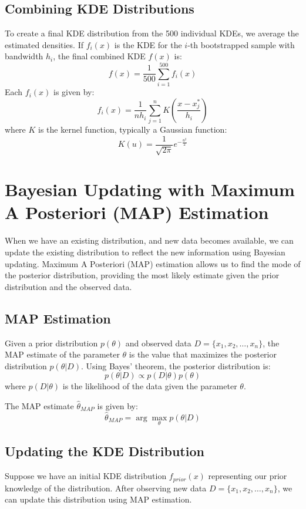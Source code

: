 \documentclass[conference]{IEEEtran}
\begin{document}
\subsection{Combining KDE Distributions}
To create a final KDE distribution from the 500 individual KDEs, we average the estimated densities. If \( f_i(x) \) is the KDE for the \( i \)-th bootstrapped sample with bandwidth \( h_i \), the final combined KDE \( f(x) \) is:
\[
f(x) = \frac{1}{500} \sum_{i=1}^{500} f_i(x)
\]
Each \( f_i(x) \) is given by:
\[
f_i(x) = \frac{1}{n h_i} \sum_{j=1}^{n} K \left( \frac{x - x_j^*}{h_i} \right)
\]
where \( K \) is the kernel function, typically a Gaussian function:
\[
K(u) = \frac{1}{\sqrt{2\pi}} e^{-\frac{u^2}{2}}
\]

\section{Bayesian Updating with Maximum A Posteriori (MAP) Estimation}
When we have an existing distribution, and new data becomes available, we can update the existing distribution to reflect the new information using Bayesian updating. Maximum A Posteriori (MAP) estimation allows us to find the mode of the posterior distribution, providing the most likely estimate given the prior distribution and the observed data.

\subsection{MAP Estimation}
Given a prior distribution \( p(\theta) \) and observed data \( D = \{x_1, x_2, \ldots, x_n\} \), the MAP estimate of the parameter \( \theta \) is the value that maximizes the posterior distribution \( p(\theta | D) \). Using Bayes' theorem, the posterior distribution is:
\[
p(\theta | D) \propto p(D | \theta) p(\theta)
\]
where \( p(D | \theta) \) is the likelihood of the data given the parameter \( \theta \).

The MAP estimate \( \hat{\theta}_{MAP} \) is given by:
\[
\hat{\theta}_{MAP} = \arg \max_\theta p(\theta | D)
\]

\subsection{Updating the KDE Distribution}
Suppose we have an initial KDE distribution \( f_{prior}(x) \) representing our prior knowledge of the distribution. After observing new data \( D = \{x_1, x_2, \ldots, x_n\} \), we can update this distribution using MAP estimation.
\end{document}
